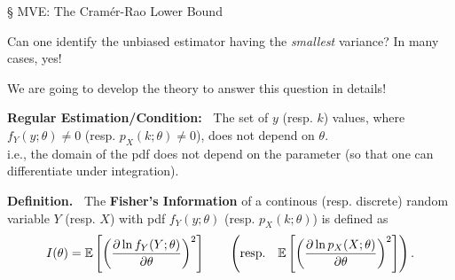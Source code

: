 \begin{frame}{\S{} MVE: The Cram\'er-Rao Lower Bound}

 \hspace{-2em}{\bf Question:~} Can one identify the unbiased estimator having the {\it smallest} variance?
 \vfill
 \hspace{-2em}{\bf Short answer:~} In many cases, yes!
 \vfill
 \begin{center}
 We are going to develop the theory to answer this question in details!
 \end{center}

 \end{frame}

 \begin{frame}

{\bf Regular Estimation/Condition:~} The set of $y$ (resp. $k$) values, where $f_Y(y;\theta)\ne 0$ (resp. $p_X(k;\theta)\ne 0$), does not depend on $\theta$.
\\[1em]
i.e., the domain of the pdf does not depend on the parameter (so that one can differentiate under integration).
 \vfill

 \pause
 {\bf Definition.~} The {\bf Fisher's Information} of a continous (resp. discrete) random variable $Y$ (resp. $X$) with pdf $f_Y(y;\theta)$ (resp. $p_X(k;\theta)$) is defined as
 \[
 I(\theta) = \mathbb{E}\left[\left(\frac{\partial \ln f_Y(Y;\theta)}{\partial \theta}\right)^2\right] \qquad \left(\text{resp.}\quad
 \mathbb{E}\left[\left(\frac{\partial \ln p_X(X;\theta)}{\partial \theta}\right)^2\right]
 \right).
   \]


 \end{frame}
